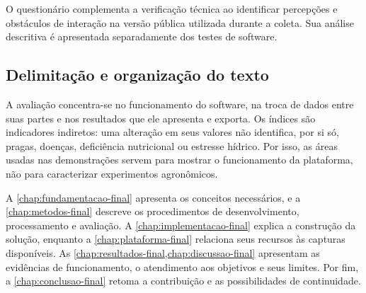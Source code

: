 O questionário complementa a verificação técnica ao identificar percepções e obstáculos de interação na versão pública utilizada durante a coleta. Sua análise descritiva é apresentada separadamente dos testes de software.

\subsection{Delimitação e organização do texto}

A avaliação concentra-se no funcionamento do software, na troca de dados entre suas partes e nos resultados que ele apresenta e exporta. Os índices são indicadores indiretos: uma alteração em seus valores não identifica, por si só, pragas, doenças, deficiência nutricional ou estresse hídrico. Por isso, as áreas usadas nas demonstrações servem para mostrar o funcionamento da plataforma, não para caracterizar experimentos agronômicos.

A \cref{chap:fundamentacao-final} apresenta os conceitos necessários, e a \cref{chap:metodos-final} descreve os procedimentos de desenvolvimento, processamento e avaliação. A \cref{chap:implementacao-final} explica a construção da solução, enquanto a \cref{chap:plataforma-final} relaciona seus recursos às capturas disponíveis. As \cref{chap:resultados-final,chap:discussao-final} apresentam as evidências de funcionamento, o atendimento aos objetivos e seus limites. Por fim, a \cref{chap:conclusao-final} retoma a contribuição e as possibilidades de continuidade.
